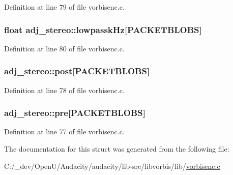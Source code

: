 Definition at line 79 of file vorbisenc.\+c.

\subsubsection[{\texorpdfstring{lowpassk\+Hz}{lowpasskHz}}]{\setlength{\rightskip}{0pt plus 5cm}float adj\+\_\+stereo\+::lowpassk\+Hz\mbox{[}{\bf P\+A\+C\+K\+E\+T\+B\+L\+O\+BS}\mbox{]}}\hypertarget{structadj__stereo_aff4713a11cb5a9d22a61a32f9b20c0d8}{}\label{structadj__stereo_aff4713a11cb5a9d22a61a32f9b20c0d8}


Definition at line 80 of file vorbisenc.\+c.

\subsubsection[{\texorpdfstring{post}{post}}]{ adj\+\_\+stereo\+::post\mbox{[}{\bf P\+A\+C\+K\+E\+T\+B\+L\+O\+BS}\mbox{]}}\hypertarget{structadj__stereo_a4b578638118067c75ffe2768921f1f9e}{}\label{structadj__stereo_a4b578638118067c75ffe2768921f1f9e}


Definition at line 78 of file vorbisenc.\+c.

\subsubsection[{\texorpdfstring{pre}{pre}}]{ adj\+\_\+stereo\+::pre\mbox{[}{\bf P\+A\+C\+K\+E\+T\+B\+L\+O\+BS}\mbox{]}}\hypertarget{structadj__stereo_a407eb6cd5c50925e4430031d365f075a}{}\label{structadj__stereo_a407eb6cd5c50925e4430031d365f075a}


Definition at line 77 of file vorbisenc.\+c.



The documentation for this struct was generated from the following file\+:\begin{DoxyCompactItemize}
\item 
C\+:/\+\_\+dev/\+Open\+U/\+Audacity/audacity/lib-\/src/libvorbis/lib/\hyperlink{vorbisenc_8c}{vorbisenc.\+c}\end{DoxyCompactItemize}
